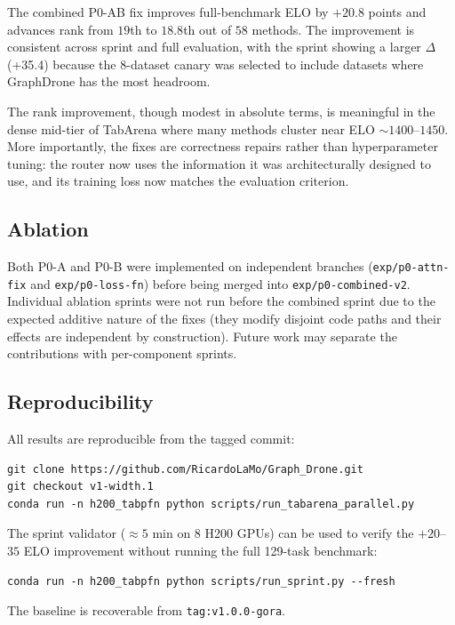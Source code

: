 The combined P0-AB fix improves full-benchmark ELO by $+20.8$ points
and advances rank from $19$th to $18.8$th out of $58$ methods.
The improvement is consistent across sprint and full evaluation, with the
sprint showing a larger $\Delta$ (+35.4) because the 8-dataset canary
was selected to include datasets where GraphDrone has the most
headroom.

The rank improvement, though modest in absolute terms, is meaningful in
the dense mid-tier of TabArena where many methods cluster near ELO
$\sim 1400$--$1450$.
More importantly, the fixes are correctness repairs rather than
hyperparameter tuning: the router now uses the information it was
architecturally designed to use, and its training loss now matches the
evaluation criterion.

\subsection{Ablation}
\label{sec:p0_ablation}

Both P0-A and P0-B were implemented on independent branches
(\texttt{exp/p0-attn-fix} and \texttt{exp/p0-loss-fn}) before being
merged into \texttt{exp/p0-combined-v2}.
Individual ablation sprints were not run before the combined sprint due
to the expected additive nature of the fixes (they modify disjoint
code paths and their effects are independent by construction).
Future work may separate the contributions with per-component sprints.

\subsection{Reproducibility}
\label{sec:p0_repro}

All results are reproducible from the tagged commit:

\begin{verbatim}
git clone https://github.com/RicardoLaMo/Graph_Drone.git
git checkout v1-width.1
conda run -n h200_tabpfn python scripts/run_tabarena_parallel.py
\end{verbatim}

The sprint validator ($\approx 5$ min on 8 H200 GPUs) can be used to
verify the $+20$--$35$ ELO improvement without running the full
129-task benchmark:

\begin{verbatim}
conda run -n h200_tabpfn python scripts/run_sprint.py --fresh
\end{verbatim}

The baseline is recoverable from \texttt{tag:v1.0.0-gora}.
